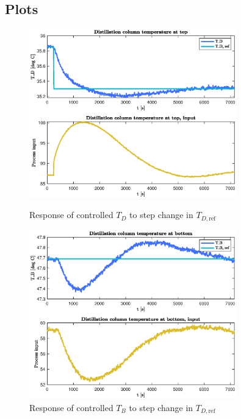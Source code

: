 \documentclass[12pt]{article}
\begin{document}
\subsection{Plots}

\begin{figure}[p]
\centering
\includegraphics[width=0.8\textwidth]{../Systemanalyse/Log_Data_to_Matlab/Figurer/LV_tuning/T_D_closed_loop_with_T_D_step.eps}
\caption{Response of controlled $T_D$ to step change in $T_{D, \textrm{ref}}$}
\label{fig:TD_TD_cl}

\includegraphics[width=0.8\textwidth]{../Systemanalyse/Log_Data_to_Matlab/Figurer/LV_tuning/T_B_closed_loop_with_T_D_step.eps}
\caption{Response of controlled $T_B$ to step change in $T_{D, \textrm{ref}}$}
\label{fig:TB_TD_cl}
\end{figure}
\end{document}
